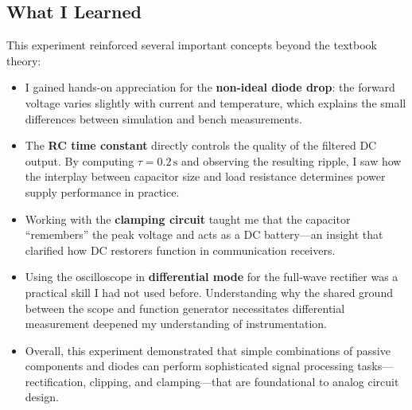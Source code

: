 \documentclass[12pt, letterpaper]{article}
\begin{document}
\subsection*{What I Learned}
This experiment reinforced several important concepts beyond the textbook theory:
\begin{itemize}
	\item I gained hands-on appreciation for the \textbf{non-ideal diode drop}: the forward voltage varies slightly with current and temperature, which explains the small differences between simulation and bench measurements.
	\item The \textbf{RC time constant} directly controls the quality of the filtered DC output. By computing $\tau = 0.2\,\text{s}$ and observing the resulting ripple, I saw how the interplay between capacitor size and load resistance determines power supply performance in practice.
	\item Working with the \textbf{clamping circuit} taught me that the capacitor ``remembers'' the peak voltage and acts as a DC battery---an insight that clarified how DC restorers function in communication receivers.
	\item Using the oscilloscope in \textbf{differential mode} for the full-wave rectifier was a practical skill I had not used before. Understanding why the shared ground between the scope and function generator necessitates differential measurement deepened my understanding of instrumentation.
	\item Overall, this experiment demonstrated that simple combinations of passive components and diodes can perform sophisticated signal processing tasks---rectification, clipping, and clamping---that are foundational to analog circuit design.
\end{itemize}
\end{document}
